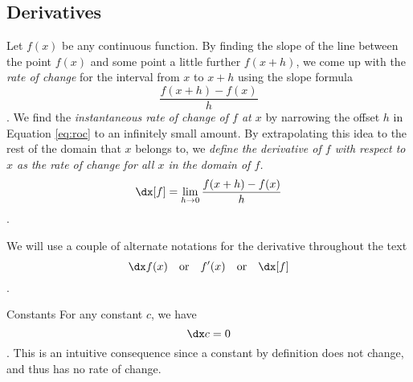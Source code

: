 \subsection{Derivatives}

Let $f(x)$ be any continuous function. By finding the slope of the line between
the point $f(x)$ and some point a little further $f(x+h)$, we come up with the
\emph{rate of change} for the interval from $x$ to $x + h$ using the slope
formula
\begin{equation}\label{eq:roc}
    \frac{f(x+h)-f(x)}{h}
\end{equation}
. We find the \emph{instantaneous rate of change of $f$ at $x$} by
narrowing the offset $h$ in Equation \ref{eq:roc} to an infinitely small
amount. By extrapolating this idea to the rest of the domain that $x$
belongs to, we \emph{define the derivative of $f$ with respect to $x$ as the
rate of change for all $x$ in the domain of $f$.}
\begin{equation}\label{eq:derivative}
    \dx[f] = \lim_{h\rightarrow 0} \frac{f(x + h) - f(x)}{h}
\end{equation}.

We will use a couple of alternate notations for the derivative
throughout the text
\begin{equation*}
    \dx f(x) \quad \text{or} \quad f'(x) \quad \text{or} \quad \dx[f]
\end{equation*}.




\begin{psec}{Constants}\label{rule:derivative constants} For any constant $c$,
    we have
    \begin{equation}\label{eq:derivative constant}
        \dx c = 0
    \end{equation}
    . This is an intuitive consequence since a constant by definition does not
    change, and thus has no rate of change.

\end{psec}

